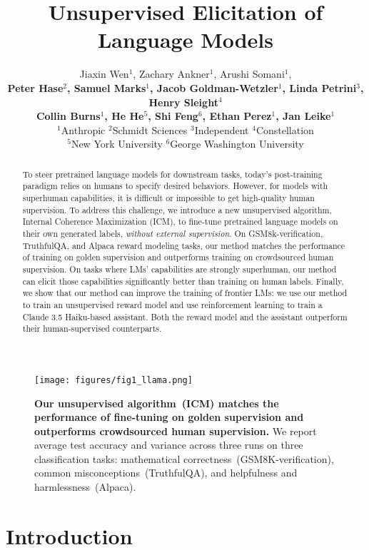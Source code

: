 \documentclass{article}
\title{Unsupervised Elicitation of Language Models}
\author{Jiaxin Wen$^1$, Zachary Ankner$^1$, Arushi Somani$^1$,
\\
\textbf{Peter Hase$^{2}$, Samuel Marks$^1$, Jacob Goldman-Wetzler$^1$, Linda Petrini$^3$, Henry Sleight$^4$}\\
\textbf{Collin Burns$^1$, He He$^5$, Shi Feng$^{6}$, Ethan Perez$^1$, Jan Leike$^1$}\\
$^1$Anthropic $^2$Schmidt Sciences $^3$Independent $^4$Constellation\\
$^5$New York University $^6$George Washington University
}
\newcommand{\ourmethod}[0]{\textsc{ICM}\xspace}
\begin{document}
\maketitle


\begin{abstract}
  To steer pretrained language models for downstream tasks, today's post-training paradigm relies on humans to specify desired behaviors. However, for models with superhuman capabilities, it is difficult or impossible to get high-quality human supervision.
  To address this challenge, we introduce a new unsupervised algorithm, Internal Coherence Maximization (ICM), to fine-tune pretrained language models on their own generated labels, \emph{without external supervision}.   
  On GSM8k-verification, TruthfulQA, and Alpaca reward modeling tasks, our method matches the performance of training on golden supervision and outperforms training on crowdsourced human supervision. On tasks where LMs' capabilities are strongly superhuman, our method can elicit those capabilities significantly better than training on human labels. Finally, we show that our method can improve the training of frontier LMs: we use our method to train an unsupervised reward model and use reinforcement learning to train a Claude 3.5 Haiku-based assistant. Both the reward model and the assistant outperform their human-supervised counterparts.
\end{abstract}


\begin{figure*}[!h]
\vspace{-6mm}
\vspace{3pt}
\centering
\texttt{[image: figures/fig1\_llama.png]}
\vspace{-4pt}
\caption{\textbf{Our unsupervised algorithm~(\ourmethod) matches the performance of fine-tuning on golden supervision and outperforms crowdsourced human supervision.} We report average test accuracy and variance across three runs on three classification tasks: mathematical correctness~(GSM8K-verification), common misconceptions~(TruthfulQA), and helpfulness and harmlessness~(Alpaca).} 
\label{fig:headline}
\end{figure*}


\section{Introduction}
\end{document}

